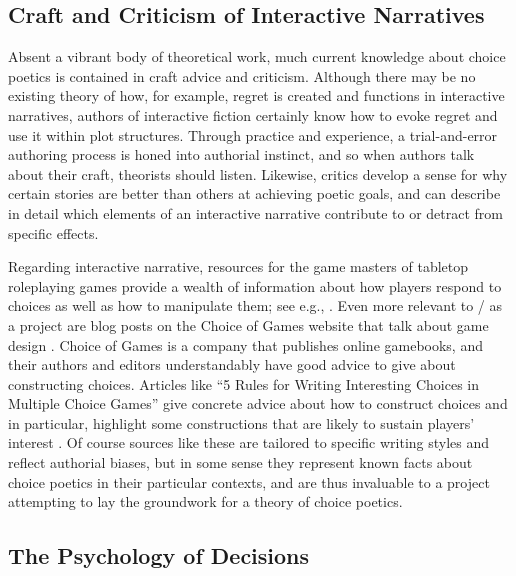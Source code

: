 \subsection{Craft and Criticism of Interactive Narratives}
\label{sec:interactive-craft-advice}

Absent a vibrant body of theoretical work, much current knowledge about choice poetics is contained in craft advice and criticism.
%
Although there may be no existing theory of how, for example, regret is created and functions in interactive narratives, authors of interactive fiction certainly know how to evoke regret and use it within plot structures.
%
Through practice and experience, a trial-and-error authoring process is honed into authorial instinct, and so when authors talk about their craft, theorists should listen.
%
Likewise, critics develop a sense for why certain stories are better than others at achieving poetic goals, and can describe in detail which elements of an interactive narrative contribute to or detract from specific effects.


Regarding interactive narrative, resources for the game masters of tabletop roleplaying games provide a wealth of information about how players respond to choices as well as how to manipulate them; see e.g., \citep{Laws2001}.
%
Even more relevant to \dunyazad/ as a project are blog posts on the Choice of Games website that talk about game design \citep{ChoiceOfGamesGameDesignCategory}.
%
Choice of Games is a company that publishes online gamebooks, and their authors and editors understandably have good advice to give about constructing choices.
%
Articles like ``5 Rules for Writing Interesting Choices in Multiple Choice Games'' give concrete advice about how to construct choices and in particular, highlight some constructions that are likely to sustain players' interest \citep{ChoiceOfGamesChoiceRules}.
%
Of course sources like these are tailored to specific writing styles and reflect authorial biases, but in some sense they represent known facts about choice poetics in their particular contexts, and are thus invaluable to a project attempting to lay the groundwork for a theory of choice poetics.


\subsection{The Psychology of Decisions}

